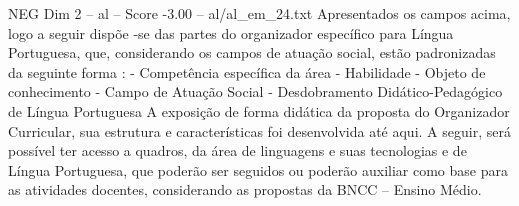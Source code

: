 \begin{textsample}{NEG Dim 2 – al – Score -3.00 – al/al\_em\_24.txt}
Apresentados os campos acima, logo a seguir dispõe -se das partes do organizador específico para Língua Portuguesa, que, considerando os campos de atuação social, estão padronizadas da seguinte forma : - Competência específica da área - Habilidade - Objeto de conhecimento - Campo de Atuação Social - Desdobramento Didático-Pedagógico de Língua Portuguesa A exposição de forma didática da proposta do Organizador Curricular, sua estrutura e características foi desenvolvida até aqui.
A seguir, será possível ter acesso a quadros, da área de linguagens e suas tecnologias e de Língua Portuguesa, que poderão ser seguidos ou poderão auxiliar como base para as atividades docentes, considerando as propostas da BNCC – Ensino Médio.

\end{textsample}
